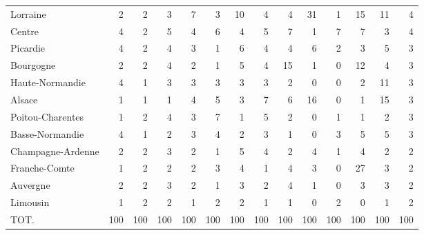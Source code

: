\documentclass[11pt]{article}
\begin{document}
\begin{table}[H]
\begin{tabular}{lrrrrrrrrrrrrr}
Lorraine             &          2 &          2 &          3 &          7 &          3 &         10 &          4 &          4 &         31 &          1 &         15 &         11 &          4 \\
Centre               &          4 &          2 &          5 &          4 &          6 &          4 &          5 &          7 &          1 &          7 &          7 &          3 &          4 \\
Picardie             &          4 &          2 &          4 &          3 &          1 &          6 &          4 &          4 &          6 &          2 &          3 &          5 &          3 \\
Bourgogne            &          2 &          2 &          4 &          2 &          1 &          5 &          4 &         15 &          1 &          0 &         12 &          4 &          3 \\
Haute-Normandie      &          4 &          1 &          3 &          3 &          3 &          3 &          3 &          2 &          0 &          0 &          2 &         11 &          3 \\
Alsace               &          1 &          1 &          1 &          4 &          5 &          3 &          7 &          6 &         16 &          0 &          1 &         15 &          3 \\
Poitou-Charentes     &          1 &          2 &          4 &          3 &          7 &          1 &          5 &          2 &          0 &          1 &          1 &          2 &          3 \\
Basse-Normandie      &          4 &          1 &          2 &          3 &          4 &          2 &          3 &          1 &          0 &          3 &          5 &          5 &          3 \\
Champagne-Ardenne    &          2 &          2 &          3 &          2 &          1 &          5 &          4 &          2 &          4 &          1 &          4 &          2 &          2 \\
Franche-Comte        &          1 &          2 &          2 &          2 &          3 &          4 &          1 &          4 &          3 &          0 &         27 &          3 &          2 \\
Auvergne             &          2 &          2 &          3 &          2 &          1 &          3 &          2 &          4 &          1 &          0 &          3 &          3 &          2 \\
Limousin             &          1 &          2 &          2 &          1 &          2 &          2 &          1 &          1 &          0 &          2 &          0 &          1 &          2 \\
TOT.                 &        100 &        100 &        100 &        100 &        100 &        100 &        100 &        100 &        100 &        100 &        100 &        100 &        100 \\
\bottomrule
\end{tabular}

\end{table}
\end{document}
